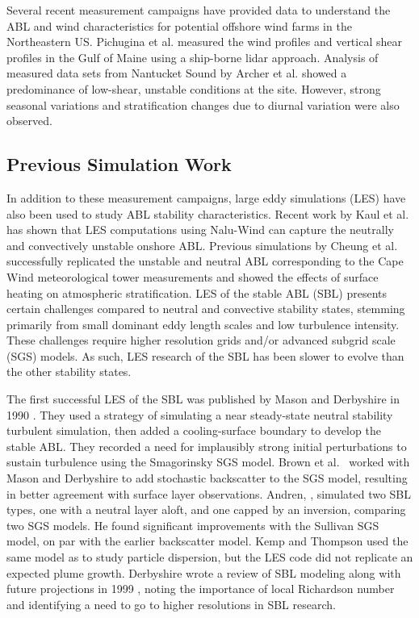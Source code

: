 \documentclass[conf]{new-aiaa}
\begin{document}
Several recent measurement campaigns have provided data to understand
the ABL and wind characteristics for potential offshore wind farms in
the Northeastern US.  Pichugina et al. \cite{pichugina2017properties}
measured the wind profiles and vertical shear profiles in the Gulf of
Maine using a ship-borne lidar approach.  Analysis of measured data
sets from Nantucket Sound by Archer et
al. \cite{archer2016predominance} showed a predominance of low-shear,
unstable conditions at the site.  However, strong seasonal variations
and stratification changes due to diurnal variation were also
observed.

\subsection{Previous Simulation Work}

In addition to these measurement campaigns, large eddy simulations (LES) have
also been used to study ABL stability characteristics.  Recent work by
Kaul et al. \cite{kaul2020large} has shown that LES computations using
Nalu-Wind can capture the neutrally and convectively unstable onshore
ABL.  Previous simulations by Cheung et al. \cite{cheung2020large}
successfully replicated the unstable and neutral ABL corresponding to
the Cape Wind meteorological tower measurements
\cite{archer2016predominance} and showed the effects of surface
heating on atmospheric stratification. LES of the stable ABL (SBL) presents 
certain challenges compared to neutral and convective stability states, stemming 
primarily from small dominant eddy length scales and low turbulence intensity. 
These challenges require higher resolution grids and/or advanced subgrid 
scale (SGS) models. As such, LES research of the SBL has been slower 
to evolve than the other stability states.  

The first successful LES of the SBL was published by Mason and Derbyshire in 
1990 \cite{Mason1990}. They used a strategy of simulating a near steady-state 
neutral stability turbulent simulation, then added a cooling-surface boundary 
to develop the stable ABL. They recorded a need for implausibly strong initial 
perturbations to sustain turbulence using the Smagorinsky SGS model. Brown et 
al.\ \cite{Brown1994} worked with Mason and Derbyshire to add stochastic backscatter 
to the SGS model, resulting in better agreement with surface layer observations. 
Andren, \cite{Andren1995}, simulated two SBL types, one with a neutral layer aloft, and 
one capped by an inversion, comparing two SGS models. He found significant improvements 
with the Sullivan SGS model, on par with the earlier backscatter model. Kemp and 
Thompson \cite{Kemp1996} used the same model as \cite{Brown1994} to study particle 
dispersion, but the LES code did not replicate an expected plume growth. Derbyshire 
wrote a review of SBL modeling along with future projections in 1999 \cite{Derbyshire1999}, 
noting the importance of local Richardson number and identifying a need to go 
to higher resolutions in SBL research. 
\end{document}
